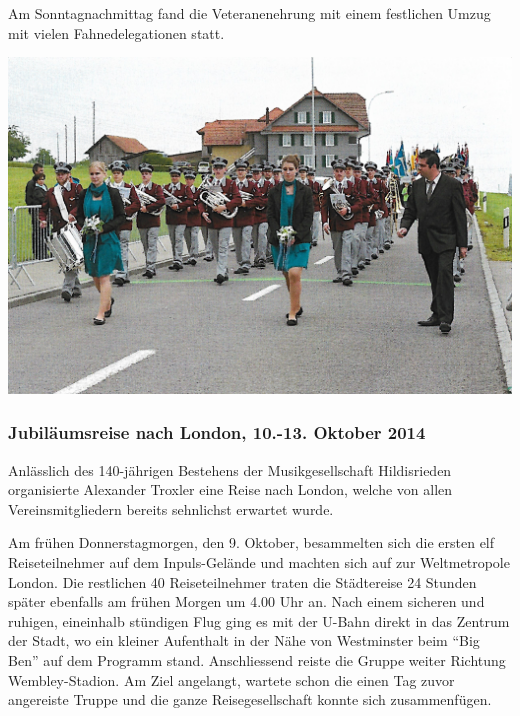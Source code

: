 \begin{history}
    Am Sonntagnachmittag fand die Veteranenehrung mit einem festlichen Umzug mit
    vielen Fahnedelegationen statt.

    \begin{MulticolFigure}
        \centering
        \includegraphics[width=0.93\linewidth]{./chap/2001-2024/2013/MGH-Umzug.jpg}
    \end{MulticolFigure}

    \subsubsection*{Jubiläumsreise nach London, 10.-13. Oktober 2014}

    Anlässlich des 140-jährigen Bestehens der Musikgesellschaft Hildisrieden
    organisierte Alexander Troxler eine Reise nach London, welche von allen
    Vereinsmitgliedern bereits sehnlichst erwartet wurde.

    Am frühen Donnerstagmorgen, den 9. Oktober, besammelten sich die ersten elf
    Reiseteilnehmer auf dem Inpuls-Gelände und machten sich auf zur
    Weltmetropole London. Die restlichen 40 Reiseteilnehmer traten die
    Städtereise 24 Stunden später ebenfalls am frühen Morgen um 4.00 Uhr an.
    Nach einem sicheren und ruhigen, eineinhalb stündigen Flug ging es mit der
    U-Bahn direkt in das Zentrum der Stadt, wo ein kleiner Aufenthalt in der
    Nähe von Westminster beim \enquote{Big Ben} auf dem Programm stand.
    Anschliessend reiste die Gruppe weiter Richtung Wembley-Stadion. Am Ziel
    angelangt, wartete schon die einen Tag zuvor angereiste Truppe und die ganze
    Reisegesellschaft konnte sich zusammenfügen.


\end{history}
